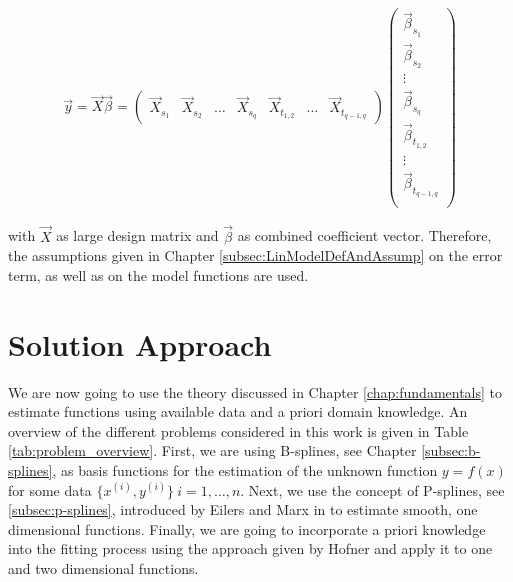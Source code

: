\documentclass[10pt,a4paper]{report}
\begin{document}
\begin{align} \label{eq:STAR-block-diag}
	\vec{y} = \vec{X} \vec{\beta} = 
			\begin{pmatrix}
				\vec{X}_{s_1} &   \vec{X}_{s_2} & \dots & \vec{X}_{s_q} & \vec{X}_{t_{1,2}} & \dots & \vec{X}_{t_{q-1, q}}    
			\end{pmatrix} \begin{pmatrix} \vec{\beta}_{s_1} \\ \vec{\beta}_{s_2} \\ \vdots \\ \vec{\beta}_{s_q} \\ \vec{\beta}_{t_{1,2}} \\ \vdots \\ \vec{\beta}_{t_{q-1, q}} \\
		\end{pmatrix}
\end{align}

with $\vec{X}$ as large design matrix and $\vec{\beta}$ as combined coefficient vector. Therefore, the assumptions given in Chapter \ref{subsec:LinModelDefAndAssump} on the error term, as well as on the model functions are used. \cite{fahrmeir2004penalized}


\chapter{Solution Approach} \label{chap:solution-approach}

We are now going to use the theory discussed in Chapter \ref{chap:fundamentals} to estimate functions using available data and a priori domain knowledge. An overview of the different problems considered in this work is given in Table \ref{tab:problem_overview}. First, we are using B-splines, see Chapter \ref{subsec:b-splines}, as basis functions for the estimation of the unknown function $y = f(x)$ for some data $\{x^{(i)}, y^{(i)}\} \ i = 1, \dots, n$.  Next, we use the concept of P-splines, see \ref{subsec:p-splines},  introduced by Eilers and Marx in \cite{eilers1996flexible} to estimate smooth, one dimensional functions. Finally, we are going to incorporate a priori knowledge into the fitting process using the approach given by Hofner and apply it to one and two dimensional functions. \cite{hofner2011monotonicity} 
\end{document}

